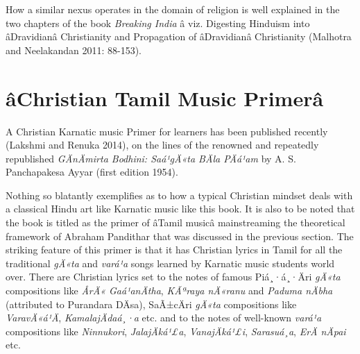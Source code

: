How a similar nexus operates in the domain of religion is well explained in the two chapters of the book \textit{Breaking India} â viz. Digesting Hinduism into âDravidianâ Christianity and Propagation of âDravidianâ Christianity (Malhotra and Neelakandan 2011: 88-153).

\newpage

\section*{âChristian Tamil Music Primerâ}

A Christian Karnatic music Primer for learners has been published recently (Lakshmi and Renuka 2014), on the lines of the renowned and repeatedly republished \textit{GÄnÄmirta Bodhini: Saá¹gÄ«ta BÄla PÄá¹­am} by A. S. Panchapakesa Ayyar (first edition 1954).

Nothing so blatantly exemplifies as to how a typical Christian mindset deals with a classical Hindu art like Karnatic music like this book. It is also to be noted that the book is titled as the primer of âTamil musicâ mainstreaming the theoretical framework of Abraham Pandithar that was discussed in the previous section. The striking feature of this primer is that it has Christian lyrics in Tamil for all the traditional \textit{gÄ«ta} and \textit{vará¹a} songs learned by Karnatic music students world over. There are Christian lyrics set to the notes of famous Piá¸·á¸·Äri \textit{gÄ«ta} compositions like \textit{ÅrÄ« Gaá¹anÄtha}, \textit{KÃªraya nÄ«ranu} and \textit{Paduma nÄbha }(attributed to Purandara DÄsa), SaÃ±cÄri \textit{gÄ«ta} compositions like \textit{VaravÄ«á¹Ä}, \textit{KamalajÄdaá¸·a} etc. and to the notes of well-known \textit{vará¹a} compositions like \textit{Ninnukori}, \textit{JalajÄká¹£a}, \textit{VanajÄká¹£i}, \textit{Sarasuá¸a}, \textit{ErÄ nÄpai} etc.

